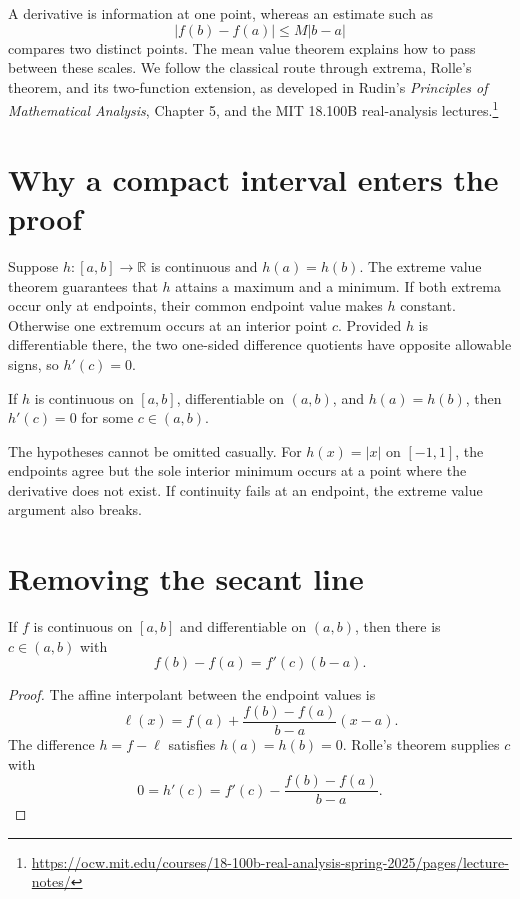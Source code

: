 
A derivative is information at one point, whereas an estimate such as
\[
  |f(b)-f(a)|\le M|b-a|
\]
compares two distinct points. The mean value theorem explains how to pass between these scales. We follow the classical route through extrema, Rolle's theorem, and its two-function extension, as developed in Rudin's \emph{Principles of Mathematical Analysis}, Chapter 5, and the MIT 18.100B real-analysis lectures.\footnote{\url{https://ocw.mit.edu/courses/18-100b-real-analysis-spring-2025/pages/lecture-notes/}}

\section{Why a compact interval enters the proof}

Suppose \(h:[a,b]\to\mathbb R\) is continuous and \(h(a)=h(b)\). The extreme value theorem guarantees that \(h\) attains a maximum and a minimum. If both extrema occur only at endpoints, their common endpoint value makes \(h\) constant. Otherwise one extremum occurs at an interior point \(c\). Provided \(h\) is differentiable there, the two one-sided difference quotients have opposite allowable signs, so \(h'(c)=0\).

\begin{theorem}[Rolle]
If \(h\) is continuous on \([a,b]\), differentiable on \((a,b)\), and \(h(a)=h(b)\), then \(h'(c)=0\) for some \(c\in(a,b)\).
\end{theorem}

The hypotheses cannot be omitted casually. For \(h(x)=|x|\) on \([-1,1]\), the endpoints agree but the sole interior minimum occurs at a point where the derivative does not exist. If continuity fails at an endpoint, the extreme value argument also breaks.

\section{Removing the secant line}

\begin{theorem}
If \(f\) is continuous on \([a,b]\) and differentiable on \((a,b)\), then there is \(c\in(a,b)\) with
\[
  f(b)-f(a)=f'(c)(b-a).
\]
\end{theorem}
\begin{proof}
The affine interpolant between the endpoint values is
\[
  \ell(x)=f(a)+\frac{f(b)-f(a)}{b-a}(x-a).
\]
The difference \(h=f-\ell\) satisfies \(h(a)=h(b)=0\). Rolle's theorem supplies \(c\) with
\[
  0=h'(c)=f'(c)-\frac{f(b)-f(a)}{b-a}.
\]
\end{proof}

